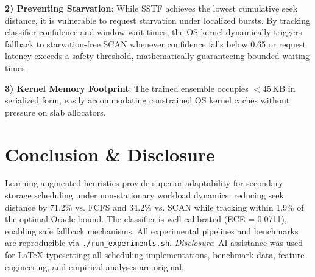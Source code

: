 \documentclass[conference,10pt]{IEEEtran}
\begin{document}
\noindent\textbf{2) Preventing Starvation}: While SSTF achieves the lowest cumulative seek distance, it is vulnerable to request starvation under localized bursts. By tracking classifier confidence and window wait times, the OS kernel dynamically triggers fallback to starvation-free SCAN whenever confidence falls below 0.65 or request latency exceeds a safety threshold, mathematically guaranteeing bounded waiting times.

\noindent\textbf{3) Kernel Memory Footprint}: The trained ensemble occupies $<45\,\text{KB}$ in serialized form, easily accommodating constrained OS kernel caches without pressure on slab allocators.

\section{Conclusion \& Disclosure}
Learning-augmented heuristics provide superior adaptability for secondary storage scheduling under non-stationary workload dynamics, reducing seek distance by 71.2\% vs. FCFS and 34.2\% vs. SCAN while tracking within 1.9\% of the optimal Oracle bound. The classifier is well-calibrated (ECE = 0.0711), enabling safe fallback mechanisms. All experimental pipelines and benchmarks are reproducible via \texttt{./run\_experiments.sh}. \textit{Disclosure}: AI assistance was used for LaTeX typesetting; all scheduling implementations, benchmark data, feature engineering, and empirical analyses are original.

{\footnotesize
\def\IEEEbibitemsep{0.5pt plus 0.5pt}
\nocite{*}


}
\end{document}
